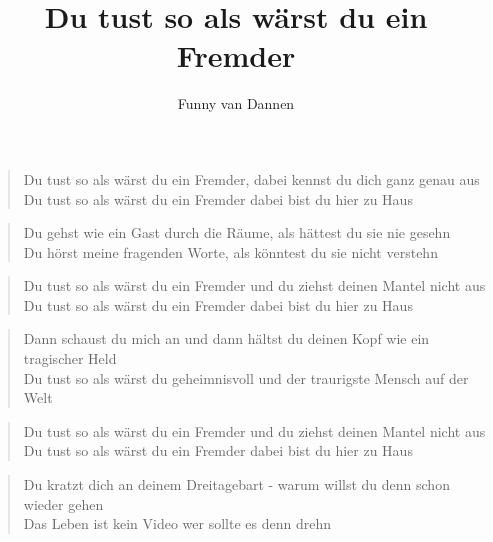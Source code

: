 \documentclass[9pt,a4paper,oneside, onecolumn]{article}
\author{Funny van Dannen}
\title{Du tust so als wärst du ein Fremder}
\date{}
\begin{document}
\begin{verse}

Du \Dm{}tust so als wärst du ein \Gm{}Fremder, dabei \C{}kennst du dich ganz genau \Dm{}aus\\
Du tust so als wärst du ein Fremder dabei bist du hier zu Haus\\

\end{verse}
\begin{verse}

Du \Gm{}gehst wie ein Gast durch die \Dm{}Räume, als \A{}hättest du sie nie ge\Dm{}sehn\\
Du hörst meine fragenden Worte, als könntest du sie nicht verstehn\\

\end{verse}
\begin{verse}

Du \Gm{}tust so als wärst du ein \Dm{}Fremder und du \C{}ziehst deinen Mantel nicht \Dm{}aus\\
Du \Gm{}tust so als wärst du ein \Dm{}Fremder da\A{}bei bist du hier zu \Dm{}Haus\\

\end{verse}
\begin{verse}

Dann \Dm{}schaust du mich an und dann \Gm{}hältst du deinen \C{}Kopf wie ein tragischer \Dm{}Held\\
Du tust so als wärst du geheimnisvoll und der traurigste Mensch auf der Welt\\

\end{verse}
\begin{verse}

Du \Gm{}tust so als wärst du ein \Dm{}Fremder und du \C{}ziehst deinen Mantel nicht \Dm{}aus\\
Du \Gm{}tust so als wärst du ein \Dm{}Fremder da\A{}bei bist du hier zu \Dm{}Haus\\

\end{verse}
\begin{verse}

Du \Dm{}kratzt dich an deinem Drei\Gm{}tagebart - warum \C{}willst du denn schon wieder \Dm{}gehen\\
Das Leben ist kein Video wer sollte es denn drehn\\

\end{verse}
\end{document}
